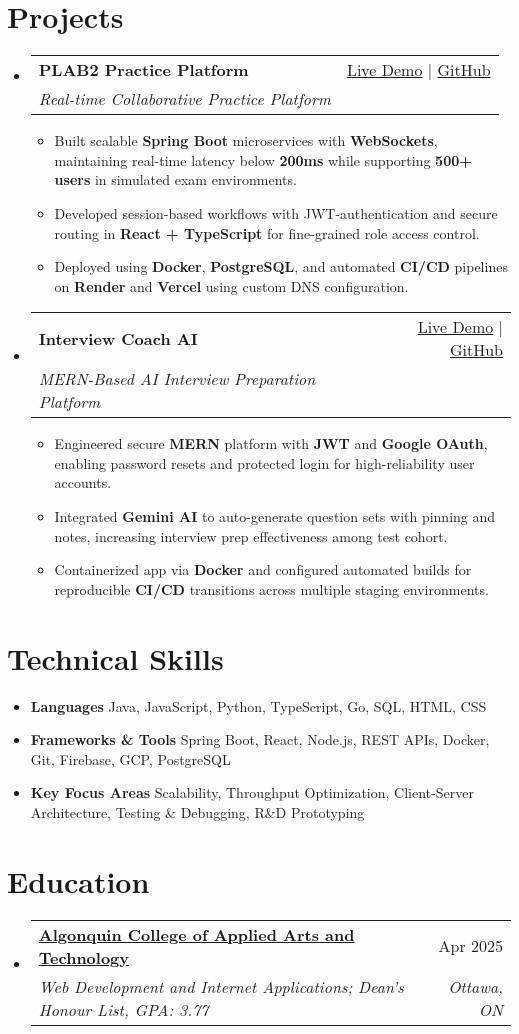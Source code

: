 \documentclass[letterpaper,11pt]{article}
\makeatletter
\newcommand{\resumeItem}[1]{\item\small{#1 \vspace{-2pt}}}
\newcommand{\resumeSubheading}[4]{
  \vspace{-1pt}\item
    \begin{tabular*}{0.97\textwidth}[t]{l@{\extracolsep{\fill}}r}
      \textbf{#1} & #2 \\
      \textit{\small#3} & \textit{\small #4} \\
    \end{tabular*}\vspace{-5pt}
}
\newcommand{\resumeSubHeadingListStart}{\begin{itemize}[leftmargin=*]}
\newcommand{\resumeSubHeadingListEnd}{\end{itemize}}
\newcommand{\resumeItemListStart}{\begin{itemize}}
\newcommand{\resumeItemListEnd}{\end{itemize}\vspace{-5pt}}
\makeatother
\begin{document}
\section{Projects}
  \resumeSubHeadingListStart
    \resumeSubheading
      {\textbf{PLAB2 Practice Platform}}{\href{https://plab2practice.com}{Live Demo} | \href{https://github.com/altansaid/plab2projectnew}{GitHub}}
      {Real-time Collaborative Practice Platform}{}
      \resumeItemListStart
        \resumeItem{Built scalable \textbf{Spring Boot} microservices with \textbf{WebSockets}, maintaining real-time latency below \textbf{200ms} while supporting \textbf{500+ users} in simulated exam environments.}
        \resumeItem{Developed session-based workflows with JWT-authentication and secure routing in \textbf{React + TypeScript} for fine-grained role access control.}
        \resumeItem{Deployed using \textbf{Docker}, \textbf{PostgreSQL}, and automated \textbf{CI/CD} pipelines on \textbf{Render} and \textbf{Vercel} using custom DNS configuration.}
      \resumeItemListEnd

    \resumeSubheading
      {\textbf{Interview Coach AI}}{\href{https://interviewcoach-ai.vercel.app/}{Live Demo} | \href{https://github.com/altansaid/interviewcoach-ai}{GitHub}}
      {MERN-Based AI Interview Preparation Platform}{}
      \resumeItemListStart
        \resumeItem{Engineered secure \textbf{MERN} platform with \textbf{JWT} and \textbf{Google OAuth}, enabling password resets and protected login for high-reliability user accounts.}
        \resumeItem{Integrated \textbf{Gemini AI} to auto-generate question sets with pinning and notes, increasing interview prep effectiveness among test cohort.}
        \resumeItem{Containerized app via \textbf{Docker} and configured automated builds for reproducible \textbf{CI/CD} transitions across multiple staging environments.}
      \resumeItemListEnd
  \resumeSubHeadingListEnd

\section{Technical Skills}
  \resumeItemListStart
    \resumeItem{\textbf{Languages}}{Java, JavaScript, Python, TypeScript, Go, SQL, HTML, CSS}
    \resumeItem{\textbf{Frameworks \& Tools}}{Spring Boot, React, Node.js, REST APIs, Docker, Git, Firebase, GCP, PostgreSQL}
    \resumeItem{\textbf{Key Focus Areas}}{Scalability, Throughput Optimization, Client-Server Architecture, Testing \& Debugging, R\&D Prototyping}
  \resumeItemListEnd

\section{Education}
  \resumeSubHeadingListStart
    \resumeSubheading
      {\href{https://www.algonquincollege.com/sat/program/web-development-internet-applications/}{Algonquin College of Applied Arts and Technology}}{Apr 2025}
      {Web Development and Internet Applications; Dean's Honour List, GPA: 3.77}{Ottawa, ON}
  \resumeSubHeadingListEnd
\end{document}
